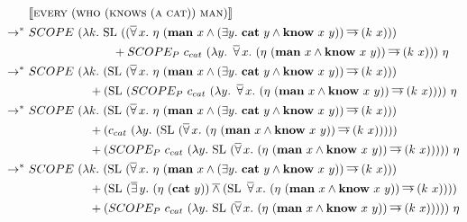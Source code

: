 \begin{align*}
  & \sem{\abs{every}\ (\abs{who}\ (\abs{knows}\ (\abs{a}\ \abs{cat}))\ \abs{man})} \\
\rightarrow^*\ & SCOPE\ (\lambda k.\ \mathrm{SL}\ ((\dforall x.\
  \eta\ (\obj{man}\ x \land (\exists y.\ \obj{cat}\ y \land
  \obj{know}\ x\ y)) \dimpl (k\ x))) \\
  & \hspace{25mm} + SCOPE_P\ c_{cat}\ (\lambda y.\ \dforall x.\ (\eta\ (\obj{man}\ x
  \land \obj{know}\ x\ y)) \dimpl (k\ x)))\ \eta \\
\rightarrow^*\ & SCOPE\ (\lambda k.\ (\mathrm{SL}\ (\dforall x.\
  \eta\ (\obj{man}\ x \land (\exists y.\ \obj{cat}\ y \land
  \obj{know}\ x\ y)) \dimpl (k\ x))) \\
  & \hspace{18mm} + (\mathrm{SL}\ (SCOPE_P\ c_{cat}\ (\lambda y.\ \dforall
  x.\ (\eta\ (\obj{man}\ x \land \obj{know}\ x\ y)) \dimpl (k\ x))))\ \eta \\
\rightarrow^*\ & SCOPE\ (\lambda k.\ (\mathrm{SL}\ (\dforall x.\
  \eta\ (\obj{man}\ x \land (\exists y.\ \obj{cat}\ y \land
  \obj{know}\ x\ y)) \dimpl (k\ x))) \\
  & \hspace{18mm} + (c_{cat}\ (\lambda y.\ (\mathrm{SL}\ (\dforall
  x.\ (\eta\ (\obj{man}\ x \land \obj{know}\ x\ y)) \dimpl (k\ x))))) \\
  & \hspace{18mm} + (SCOPE_P\ c_{cat}\ (\lambda y.\ \mathrm{SL}\ (\dforall
  x.\ (\eta\ (\obj{man}\ x \land \obj{know}\ x\ y)) \dimpl (k\ x)))))\ \eta \\
\rightarrow^*\ & SCOPE\ (\lambda k.\ (\mathrm{SL}\ (\dforall x.\
  \eta\ (\obj{man}\ x \land (\exists y.\ \obj{cat}\ y \land
  \obj{know}\ x\ y)) \dimpl (k\ x))) \\
  & \hspace{18mm} + (\mathrm{SL}\ (\dexists y.\ (\eta\ (\obj{cat}\ y)) \dand (\mathrm{SL}\ \dforall
  x.\ (\eta\ (\obj{man}\ x \land \obj{know}\ x\ y)) \dimpl (k\ x)))) \\
  & \hspace{18mm} + (SCOPE_P\ c_{cat}\ (\lambda y.\ \mathrm{SL}\ (\dforall
  x.\ (\eta\ (\obj{man}\ x \land \obj{know}\ x\ y)) \dimpl (k\ x)))))\ \eta \\
\end{align*}

